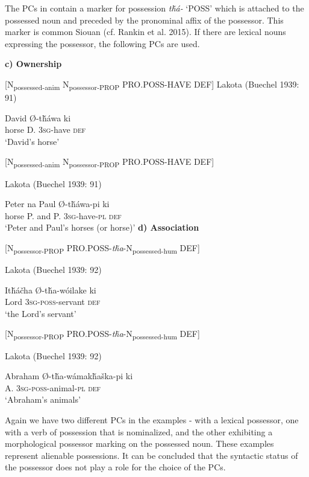 \documentclass[output=paper]{LSP/langsci}
\begin{document}
The PCs in  contain a marker for possession \textit{t\v{h}á-} `POSS' which is attached to the possessed noun and preceded by the pronominal affix of the possessor. This marker is common Siouan (cf. Rankin et al. 2015). If there are lexical nouns expressing the possessor, the following PCs are used.

\vspace{1em}
\textbf{c)	Ownership}

[N\textsubscript{possessed-anim} N\textsubscript{possessor-PROP} PRO.POSS-HAVE DEF] 
\ea	Lakota (Buechel 1939: 91) \label{lakotadavidshorse}

   David   Ø-t\v{h}áwa    ki \\
horse      D.   \textsc{3sg}-have  \textsc{def} \\
\glt `David's horse'
\z

[N\textsubscript{possessed-anim} N\textsubscript{possessor-PROP} PRO.POSS-HAVE DEF]

\ea Lakota (Buechel 1939: 91)

 Peter  na  Paul   Ø-t\v{h}áwa-pi     ki  \\
horse    P.       and P.      \textsc{3sg}-have-\textsc{pl} \textsc{def} \\
\glt `Peter and Paul's horses (or horse)'
\z
\textbf{d)	Association}

[N\textsubscript{possessor-PROP} PRO.POSS-\textit{t\v{h}a}-N\textsubscript{possessed-hum} DEF]

\ea	Lakota (Buechel 1939: 92)

\gll It\v{h}\'a\v{c}ha    Ø-t\v{h}a-wóilake   ki  \\
Lord   \textsc{3sg-poss}-servant   \textsc{def} \\
\glt `the Lord's servant'
\z

[N\textsubscript{possessor-PROP} PRO.POSS-\textit{t\v{h}a}-N\textsubscript{possessed-hum} DEF]

\ea	Lakota (Buechel 1939: 92) \label{lakotaabraham}

\gll Abraham Ø-t\v{h}a-w\'amak\v{h}a\v{s}ka-pi ki  \\
 A. \textsc{3sg-poss}-animal-\textsc{pl}  \textsc{def} \\
\glt `Abraham's animals'
\z

Again we have two different PCs in the examples - with a lexical possessor, one with a verb of possession that is nominalized, and the other exhibiting a morphological possessor marking on the possessed noun. These examples represent alienable possessions. It can be concluded that the syntactic status of the possessor does not play a role for the choice of the PCs.
\end{document}
